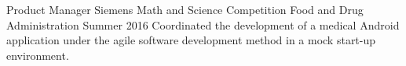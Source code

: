 
\begin{cventries}

  \cventry
    {Product Manager} %
    {Siemens Math and Science Competition} %
    {Food and Drug Administration} %
    {Summer 2016} %
    {
      Coordinated the development of a medical Android application under the agile software development method in a mock start-up environment.
    }

\end{cventries}

